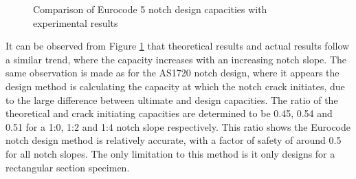 \documentclass[11pt,a4paper]{article}
\numberwithin{equation}{subsection}
\begin{document}
\begin{figure}[h]
	\begin{center}
	\end{center}
	\caption{Comparison of Eurocode 5 notch design capacities with experimental results}
	\label{fig:Eurocode}
\end{figure}

It can be observed from Figure \ref{fig:Eurocode} that theoretical results and actual results follow a similar trend, where the capacity increases with an increasing notch slope. The same observation is made as for the AS1720 notch design, where it appears the design method is calculating the capacity at which the notch crack initiates, due to the large difference between ultimate and design capacities. The ratio of the theoretical and crack initiating capacities are determined to be 0.45, 0.54 and 0.51 for a 1:0, 1:2 and 1:4 notch slope respectively. This ratio shows the Eurocode notch design method is relatively accurate, with a factor of safety of around 0.5 for all notch slopes. The only limitation to this method is it only designs for a rectangular section specimen. 
\end{document}
